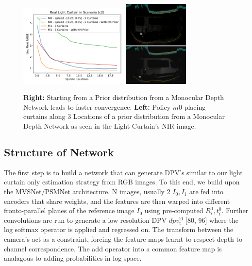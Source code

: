 \begin{figure}[h]
    \centering
    \begin{minipage}{0.5\textwidth}
        \centering
        \includegraphics[width=0.49\textwidth]{figures/figure_X.pdf}
        \includegraphics[width=0.29\textwidth]{figures/placement3.png}
    \end{minipage}\hfill
    \centering
    \caption{ \textbf{Right:} Starting from a Prior distribution from a Monocular Depth Network leads to faster convergence. \textbf{Left:} Policy $m0$ placing curtains along 3 Locations of a prior distribution from a Monocular Depth Network as seen in the Light Curtain's NIR image.}
    \label{fig:prior} 
\end{figure}

\subsection{Structure of Network}

The first step is to build a network that can generate DPV's similar to our light curtain only estimation strategy from RGB images. To this end, we build upon the MVSNet/PSMNet architecture. N images, usually 2 $I_{0}, I_{1}$ are fed into encoders that share weights, and the features are then warped into different fronto-parallel planes of the reference image $I_{0}$ using pre-computed $R_{i}^{0}, t_{i}^{0}$. Further convolutions are run to generate a low resolution DPV $dpv_{\mathrm{t}}^{\mathrm{l0}}$ [80, 96] where the log softmax operator is applied and regressed on. The transform between the camera's act as a constraint, forcing the feature maps learnt to respect depth to channel correspondence. The add operator into a common feature map is analagous to adding probabilities in log-space. 

